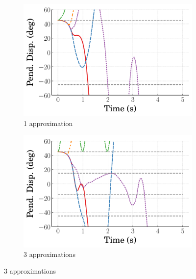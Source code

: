 \begin{figure}
    \centering
    \begin{subfigure}[b]{0.32\textwidth}
        \centering
        \includegraphics[width=\textwidth]{figures/figures_Interpretability/Mean_ISE_Inverted_Pendulum-v0_cubic_1_bins_near_equil/Curve_fit_time_responses/lumped_LQR/curve_fit_Pend_Disp_45.pdf}
        \caption{1 approximation}
        \label{subfig_chap5:lumped_LQR_near_equil_1_bins_resp_unclipped}
    \end{subfigure}
    \hfill
    \begin{subfigure}[b]{0.32\textwidth}
        \centering
        \includegraphics[width=\textwidth]{figures/figures_Interpretability/Mean_ISE_Inverted_Pendulum-v0_cubic_3_bins_near_equil/Curve_fit_time_responses/lumped_LQR/curve_fit_Pend_Disp_45.pdf}
        \caption{3 approximations}
        \label{subfig_chap5:lumped_LQR_near_equil_3_bins_resp_unclipped}

\end{subfigure}
\end{figure}
